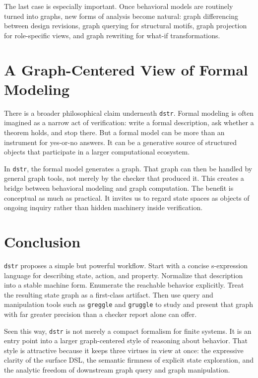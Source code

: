 \documentclass[11pt]{article}
\begin{document}
The last case is especially important. Once behavioral models are routinely
turned into graphs, new forms of analysis become natural: graph differencing
between design revisions, graph querying for structural motifs, graph projection
for role-specific views, and graph rewriting for what-if transformations.

\section{A Graph-Centered View of Formal Modeling}

There is a broader philosophical claim underneath \texttt{dstr}. Formal modeling
is often imagined as a narrow act of verification: write a formal description,
ask whether a theorem holds, and stop there. But a formal model can be more than
an instrument for yes-or-no answers. It can be a generative source of structured
objects that participate in a larger computational ecosystem.

In \texttt{dstr}, the formal model generates a graph. That graph can then be
handled by general graph tools, not merely by the checker that produced it. This
creates a bridge between behavioral modeling and graph computation. The benefit
is conceptual as much as practical. It invites us to regard state spaces as
objects of ongoing inquiry rather than hidden machinery inside verification.

\section{Conclusion}

\texttt{dstr} proposes a simple but powerful workflow. Start with a concise
s-expression language for describing state, action, and property. Normalize that
description into a stable machine form. Enumerate the reachable behavior
explicitly. Treat the resulting state graph as a first-class artifact. Then use
query and manipulation tools such as \texttt{greggle} and \texttt{gruggle} to
study and present that graph with far greater precision than a checker report
alone can offer.

Seen this way, \texttt{dstr} is not merely a compact formalism for finite
systems. It is an entry point into a larger graph-centered style of reasoning
about behavior. That style is attractive because it keeps three virtues in view
at once: the expressive clarity of the surface DSL, the semantic firmness of
explicit state exploration, and the analytic freedom of downstream graph query
and graph manipulation.



\end{document}
